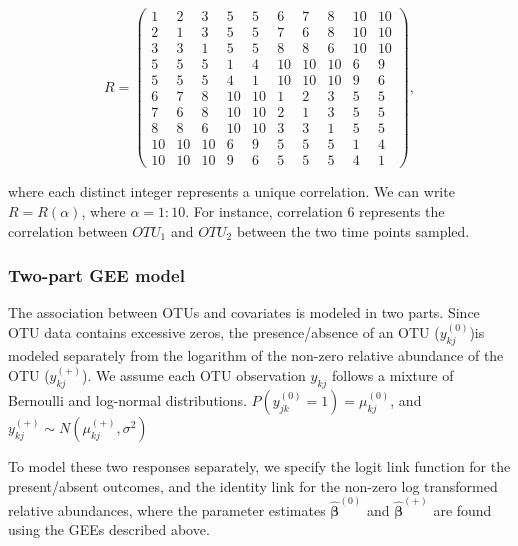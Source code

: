 \documentclass[12pt]{article}
\begin{document}
\begin{singlespace}
$$R = \begin{pmatrix}
        1 & 2 & 3 & 5 & 5 &  6 & 7 & 8 & 10 & 10 \\
        2 & 1 & 3 & 5 & 5 & 7 & 6 & 8 & 10 & 10 \\
        3 & 3 & 1 & 5 & 5 & 8 & 8 & 6 & 10 & 10 \\
        5 & 5 & 5 & 1 & 4 & 10 & 10 & 10 & 6 & 9 \\
        5 & 5 & 5 & 4 & 1 & 10 & 10 & 10  & 9 & 6 \\
        6 & 7 & 8 & 10 & 10 & 1 & 2 & 3 & 5 & 5  \\
        7 & 6 & 8 & 10 & 10 & 2 & 1 & 3 & 5 & 5  \\
        8 & 8 & 6 & 10 & 10 & 3 & 3 & 1 & 5 & 5 \\
        10 & 10 & 10 & 6 & 9 & 5 & 5 & 5 & 1 & 4  \\
        10 & 10 & 10  & 9 & 6  & 5 & 5 & 5 & 4 & 1
  \end{pmatrix},$$
\end{singlespace}
where each distinct integer represents a unique correlation. We can write $R = R(\alpha)$, where $\alpha = 1:10$. For instance, correlation 6 represents the correlation between $OTU_1$ and $OTU_2$ between the two time points sampled.

\subsubsection{Two-part GEE model}

The association between OTUs and covariates is modeled in two parts. Since OTU data contains excessive zeros, the presence/absence of an OTU ($y_{kj}^{(0)}$)is modeled separately from the logarithm of the non-zero relative abundance of the OTU ($y_{kj}^{(+)}$). We assume each OTU observation $y_{kj}$ follows a mixture of Bernoulli and log-normal distributions. $P(y_{jk}^{(0)} = 1) = \mu_{kj}^{(0)}$, and $y_{kj}^{(+)} \sim N(\mu_{kj}^{(+)}, \sigma^2)$

%
%

To model these two responses separately, we specify the logit link function for the present/absent outcomes, and the identity link for the non-zero log transformed relative abundances, where the parameter estimates $\hat{\boldsymbol\beta}^{(0)}$ and $\hat{\boldsymbol\beta}^{(+)}$ are found using the GEEs described above.
\end{document}
